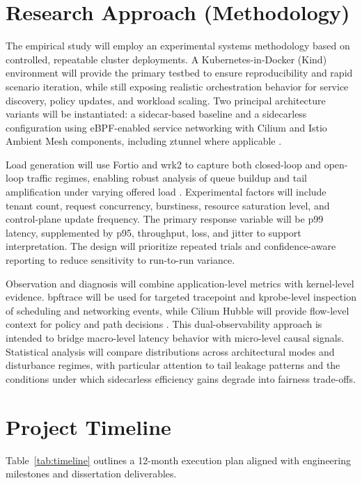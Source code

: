 \documentclass[12pt,a4paper]{article}
\begin{document}
\section{Research Approach (Methodology)}
The empirical study will employ an experimental systems methodology based on controlled, repeatable cluster deployments. A Kubernetes-in-Docker (Kind) environment will provide the primary testbed to ensure reproducibility and rapid scenario iteration, while still exposing realistic orchestration behavior for service discovery, policy updates, and workload scaling. Two principal architecture variants will be instantiated: a sidecar-based baseline and a sidecarless configuration using eBPF-enabled service networking with Cilium and Istio Ambient Mesh components, including ztunnel where applicable \cite{kindProject,istioAmbient,ciliumArchitecture}.

Load generation will use Fortio and wrk2 to capture both closed-loop and open-loop traffic regimes, enabling robust analysis of queue buildup and tail amplification under varying offered load \cite{fortio,wrk2}. Experimental factors will include tenant count, request concurrency, burstiness, resource saturation level, and control-plane update frequency. The primary response variable will be p99 latency, supplemented by p95, throughput, loss, and jitter to support interpretation. The design will prioritize repeated trials and confidence-aware reporting to reduce sensitivity to run-to-run variance.

Observation and diagnosis will combine application-level metrics with kernel-level evidence. bpftrace will be used for targeted tracepoint and kprobe-level inspection of scheduling and networking events, while Cilium Hubble will provide flow-level context for policy and path decisions \cite{bpftrace,ciliumHubble}. This dual-observability approach is intended to bridge macro-level latency behavior with micro-level causal signals. Statistical analysis will compare distributions across architectural modes and disturbance regimes, with particular attention to tail leakage patterns and the conditions under which sidecarless efficiency gains degrade into fairness trade-offs.

\section{Project Timeline}
Table~\ref{tab:timeline} outlines a 12-month execution plan aligned with engineering milestones and dissertation deliverables.
\end{document}
